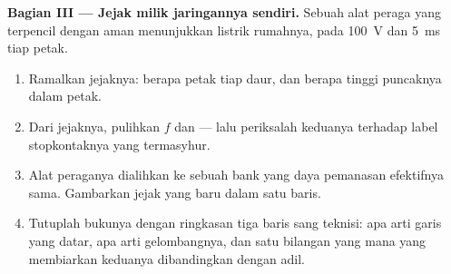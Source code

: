 \begin{problem}
\medskip\noindent\textbf{Bagian III --- Jejak milik
jaringannya sendiri.}
Sebuah alat peraga yang terpencil dengan aman menunjukkan listrik
rumahnya, pada \qty{100}{V} dan \qty{5}{ms} tiap petak.
\begin{enumerate}[resume]
  \item Ramalkan jejaknya: berapa petak tiap daur, dan berapa tinggi
        puncaknya dalam petak.
  \item Dari jejaknya, pulihkan $f$ dan  --- lalu
        periksalah keduanya terhadap label stopkontaknya yang
        termasyhur.
  \item Alat peraganya dialihkan ke sebuah bank  yang daya
        pemanasan efektifnya sama. Gambarkan jejak yang baru dalam
        satu baris.
  \item Tutuplah bukunya dengan ringkasan tiga baris sang teknisi: apa
        arti garis yang datar, apa arti gelombangnya, dan satu bilangan
        yang mana yang membiarkan keduanya dibandingkan dengan adil.
\end{enumerate}
\end{problem}
